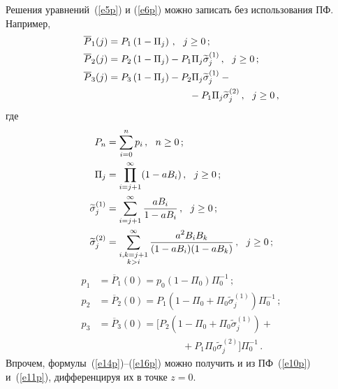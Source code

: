 \begin{multicols}{2}
Решения уравнений~(\ref{e5p}) и (\ref{e6p}) можно записать без
использования ПФ.
Например,
\begin{align}
\overline P_{1}(j) &= P_1 \left ( 1 - \Pi_j\right )\,,
\ \ j\ge 0\,; \label{e14p}\\
\overline P_{2}(j) & = P_2 \left ( 1 - \Pi_j\right ) - P_1  \Pi_{j}
\widetilde \sigma_j^{(1)}\,,
\ \ j\ge 0\,; \label{e15p}\\
\overline P_{3}(j) & = P_3 \left ( 1 - \Pi_{j}\right ) - P_2 \Pi_{j}
\widetilde \sigma_j^{(1)} -{}\notag\\
&\hspace*{50pt}\ \ \ \ \ \ \ \ \ \ {}- P_1 \Pi_{j} \widetilde \sigma_j^{(2)}\,,
\ \ j\ge 0\,, \label{e16p}
\end{align}
где
\begin{align*}
P_n & = \sum_{i=0}^n p_i\,, \ \ n\ge 0\,;\\
\Pi_j & = \prod_{i=j+1}^\infty (1 - a B_{i})\,, \ \ j\ge 0\,;\\
\widetilde \sigma_j^{(1)} & = \sum_{i=j+1}^\infty \displaystyle\frac{\displaystyle aB_i \mathstrut}{\displaystyle  1 - aB_i\mathstrut}\,,
\ \ j\ge 0\,;\\
\widetilde \sigma_j^{(2)} & =
\sum^\infty_{\substack{{i,k=j+1}\\{k>i}}}
\displaystyle\frac{\displaystyle a^2 B_i B_k \mathstrut}{\displaystyle  (1 - aB_i)(1-aB_k)\mathstrut}\,,
\ \ j\ge 0\,;
\end{align*}
\begin{align*}
p_{1} & = \overline P_1(0) = p_0 (1 - \Pi_0) \Pi_0^{-1}\,;\\
p_{2} & = \overline P_2(0) = P_1 \left ( 1 - \Pi_0 +
\Pi_0 \widetilde \sigma_j^{(1)}\right ) \Pi_0^{-1}\,;\\
p_{3} & = \overline P_3(0) = \bigg [
P_2 \left ( 1 - \Pi_0 + \Pi_0 \widetilde \sigma_j^{(1)}\right ) +{}\\
&\ \ \ \ \ \ \ \ \ \ \ \ \ \ \ \ \ \ \ \ \ \ \ \ \ \ \ \ \ \ \ \ \ \ \ \ \ \ \ {}+P_1 \Pi_0 \widetilde \sigma_j^{(2)}
\bigg ]
\Pi_0^{-1}\,.
\end{align*}
Впрочем, формулы~(\ref{e14p})--(\ref{e16p}) можно получить и из
ПФ~(\ref{e10p}) и~(\ref{e11p}), дифференцируя их в точке $z=0$.


\end{multicols}
